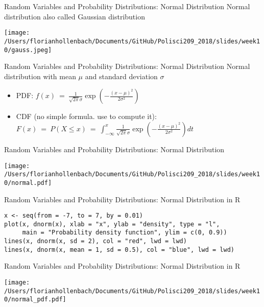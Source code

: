 \documentclass[presentation]{beamer}
\begin{document}
\begin{frame}[label={sec:org4c0e031}]{Random Variables and Probability Distributions: Normal Distribution}
\alert{Normal distribution} also called \alert{Gaussian distribution}


\begin{center}
\texttt{[image: /Users/florianhollenbach/Documents/GitHub/Polisci209\_2018/slides/week10/gauss.jpeg]}
\end{center}
\end{frame}

\begin{frame}[label={sec:orgf64d371}]{Random Variables and Probability Distributions: Normal Distribution}
\alert{Normal distribution} with mean \(\mu\) and standard deviation \(\sigma\)
\begin{itemize}
\item \alert{PDF}:
\(f(x) \ = \ \frac{1}{\sqrt{2\pi} \sigma}\exp\left(-\frac{(x - \mu)^2}{2\sigma^2}\right)\)

\item \alert{CDF} (no simple formula. use \R{} to compute it):
\(F(x) \ = \ P(X \le x) \ = \ \int_{-\infty}^x
   \frac{1}{\sqrt{2\pi}\sigma}\exp\left(-\frac{(x - \mu)^2}{2\sigma^2}\right) dt\)
\end{itemize}
\end{frame}



\begin{frame}[label={sec:org73de097}]{Random Variables and Probability Distributions: Normal Distribution}
\begin{center}
\texttt{[image: /Users/florianhollenbach/Documents/GitHub/Polisci209\_2018/slides/week10/normal.pdf]}
\end{center}
\end{frame}


\begin{frame}[fragile,shrink=30,label={sec:org7a10d10}]{Random Variables and Probability Distributions: Normal Distribution in R}
 \begin{verbatim}
x <- seq(from = -7, to = 7, by = 0.01)
plot(x, dnorm(x), xlab = "x", ylab = "density", type = "l",
     main = "Probability density function", ylim = c(0, 0.9))
lines(x, dnorm(x, sd = 2), col = "red", lwd = lwd)
lines(x, dnorm(x, mean = 1, sd = 0.5), col = "blue", lwd = lwd)
\end{verbatim}
\end{frame}


\begin{frame}[label={sec:org433401b}]{Random Variables and Probability Distributions: Normal Distribution in R}
\begin{center}
\texttt{[image: /Users/florianhollenbach/Documents/GitHub/Polisci209\_2018/slides/week10/normal\_pdf.pdf]}
\end{center}
\end{frame}
\end{document}
